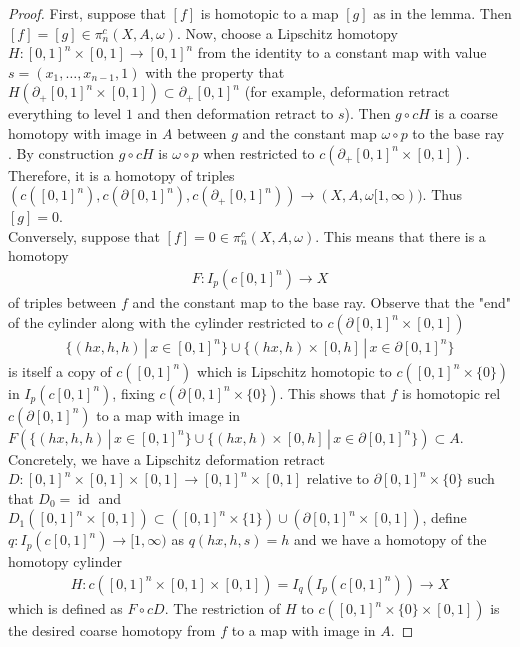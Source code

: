 \documentclass[a4paper,11pt]{article}
\theoremstyle{definition}
\theoremstyle{plain}
\theoremstyle{remark}
\DeclareMathOperator{\id}{id}
\begin{document}
\begin{proof} First, suppose that $[f]$ is homotopic to a map $[g]$ as in the lemma. Then $[f]=[g]\in \pi_n^c(X,A,\omega)$. Now, choose a Lipschitz homotopy $H: [0,1]^n \times [0,1]\rightarrow [0,1]^n$ from the identity to a constant map with value $s = (x_1,\dots,x_{n-1},1)$ with the property that $H(\partial_{+}[0,1]^n \times [0,1])\subset \partial_{+}[0,1]^n$ (for example, deformation retract everything to level $1$ and then deformation retract to $s$). Then $g \circ cH$ is a coarse homotopy with image in $A$ between $g$ and the constant map $\omega \circ p$ to the base ray . By construction $g \circ cH$ is $\omega \circ p$ when restricted to $c(\partial_{+}[0,1]^n \times [0,1])$. Therefore, it is a homotopy of triples $(c([0,1]^n), c(\partial [0,1]^n), c(\partial_{+}[0,1]^n))\rightarrow (X,A,\omega[1,\infty))$. Thus $[g]=0$. \\

Conversely, suppose that $[f] = 0 \in  \pi_n^c(X,A,\omega)$. This means that there is a homotopy
\begin{align*}
F: I_p(c[0,1]^n) \rightarrow X
\end{align*} 
of triples between $f$ and the constant map to the base ray. Observe that the "end" of the cylinder along with the cylinder restricted to $c(\partial[0,1]^n \times [0,1])$
\begin{align*}
\{(hx,h,h)\,|\, x\in [0,1]^n\} \cup \{ (hx,h) \times [0,h] \,|\,x\in \partial[0,1]^n\}
\end{align*}
is itself a copy of $c([0,1]^n)$ which is Lipschitz homotopic to $c([0,1]^n \times \{0\})$ in $I_p(c[0,1]^n)$, fixing $c(\partial[0,1]^n \times \{0\})$. This shows that $f$ is homotopic rel $c(\partial[0,1]^n)$ to a map with image in $F(\{(hx,h,h)\,|\, x\in [0,1]^n\} \cup \{ (hx,h) \times [0,h] \,|\,x\in \partial[0,1]^n\}) \subset A$. Concretely, we have a Lipschitz deformation retract $D: [0,1]^n \times [0,1] \times [0,1] \rightarrow [0,1]^n \times [0,1]$ relative to $\partial [0,1]^n \times \{0\}$ such that $D_0= \id$ and $D_{1}([0,1]^n \times [0,1])\subset ([0,1]^n \times \{1\})\cup(\partial [0,1]^n \times [0,1])$,  define $q: I_p(c[0,1]^n)\rightarrow [1,\infty)$ as $q(hx,h,s) = h$ and we have a homotopy of the homotopy cylinder 
\begin{align*}
H: c([0,1]^n \times [0,1] \times [0,1])=I_{q}(I_{p}(c[0,1]^n)) \rightarrow X 
\end{align*} 
which is defined as $F\circ cD$. The restriction of $H$ to $c([0,1]^n \times \{0\} \times [0,1])$ is the desired coarse homotopy from $f$ to a map with image in $A$.  
\end{proof}
\end{document}
